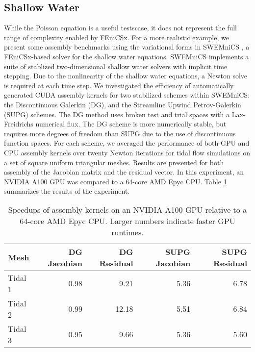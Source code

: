 \subsection*{Shallow Water}

While the Poisson equation is a useful testscase, it does not represent the full range of complexity enabled by FEniCSx. For a more realistic example, we present some assembly benchmarks using the variational forms in SWEMniCS \cite{dawson2024swemnics}, a FEniCSx-based solver for the shallow water equations. SWEMniCS implements a suite of stablized two-dimensional shallow water solvers with implicit time stepping. Due to the nonlinearity of the shallow water equations, a Newton solve is required at each time step. We investigated the efficiency of automatically generated CUDA assembly kernels for two stabilized schemes within SWEMniCS: the Discontinuous Galerkin (DG), and the Streamline Upwind Petrov-Galerkin (SUPG) schemes. The DG method uses broken test and trial spaces with a Lax-Freidrichs numerical flux. The DG scheme is more numerically stable, but requires more degrees of freedom than SUPG due to the use of discontinuous function spaces. For each scheme, we averaged the performance of both GPU and CPU assembly kernels over twenty Newton iterations for tidal flow simulations on a set of square uniform triangular meshes. Results are presented for both assembly of the Jacobian matrix and the residual vector. In this experiment, an NVIDIA A100 GPU was compared to a 64-core AMD Epyc CPU.
Table \ref{tab:swe_a100_vs_epyc} summarizes the results of the experiment.
\begin{table}[t]
    \centering
    \begin{tabular}{lrrrr}
\toprule
Mesh & DG Jacobian & DG Residual & SUPG Jacobian & SUPG Residual \\
\midrule
Tidal 1 & 0.98 & 9.21 & 5.36 & 6.78 \\
Tidal 2 & 0.99 & 12.18 & 5.51 & 6.84 \\
Tidal 3 & 0.95 & 9.66 & 5.36 & 5.60 \\
\bottomrule
\end{tabular}
    \caption{Speedups of assembly kernels on an NVIDIA A100 GPU relative to a 64-core AMD Epyc CPU. Larger numbers indicate faster GPU runtimes.}
    \label{tab:swe_a100_vs_epyc}
\end{table}

